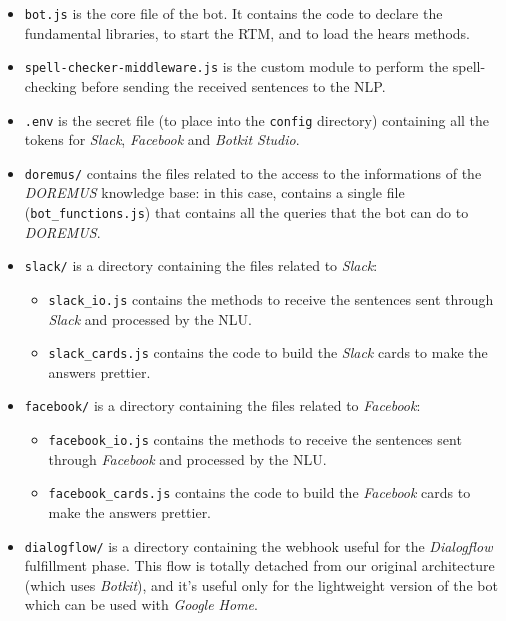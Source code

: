 \documentclass[a4paper,12pt]{report}
\begin{document}
	\begin{itemize}
		\item \texttt{bot.js} is the core file of the bot. It contains the code to declare the fundamental libraries, to start the RTM, and to load the hears methods.
		
		\item \texttt{spell-checker-middleware.js} is the custom module to perform the spell-checking before sending the received sentences to the NLP.
		
		\item \texttt{.env} is the secret file (to place into the \texttt{config} directory) containing all the tokens for \textit{Slack}, \textit{Facebook} and \textit{Botkit Studio}.
		
		\item \texttt{doremus/} contains the files related to the access to the informations of the \textit{DOREMUS} knowledge base: in this case, contains a single file (\texttt{bot\_functions.js}) that contains all the queries that the bot can do to \textit{DOREMUS}.
		
		\item \texttt{slack/} is a directory containing the files related to \textit{Slack}:
			\begin{itemize}
			\item \texttt{slack\_io.js} contains the methods to receive the sentences sent through \textit{Slack} and processed by the NLU.
			
			\item \texttt{slack\_cards.js} contains the code to build the \textit{Slack} cards to make the answers prettier.
			\end{itemize}
		\item \texttt{facebook/} is a directory containing the files related to \textit{Facebook}:
			\begin{itemize}
			\item \texttt{facebook\_io.js} contains the methods to receive the sentences sent through \textit{Facebook} and processed by the NLU.
			
			\item \texttt{facebook\_cards.js} contains the code to build the \textit{Facebook} cards to make the answers prettier.
			\end{itemize}
		\item \texttt{dialogflow/} is a directory containing the webhook useful for the \textit{Dialogflow} fulfillment phase. This flow is totally detached from our original architecture (which uses \textit{Botkit}), and it's useful only for the lightweight version of the bot which can be used with \textit{Google Home}.
	\end{itemize}
	
\end{document}
